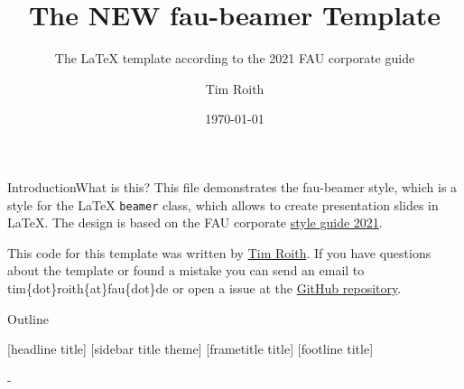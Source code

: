 \documentclass[final]{beamer}
\title[fau-beamer]{The NEW fau-beamer Template}
\subtitle{The \LaTeX{} template according to the 2021 FAU corporate guide}
\author[T. Roith]{Tim Roith}
\institute[FAU]{Friedrich-Alexander Universität Erlangen-Nürnberg, Department Mathematik}
\date{\today}
\begin{document}
\begin{trueplainframe}{}
\titlepage%
\end{trueplainframe}

\begin{frame}[t]{Introduction}{What is this?}
This file demonstrates the fau-beamer style, which is a style for the \LaTeX{} \texttt{beamer} class, which allows to create presentation slides in \LaTeX. The design is based on the FAU corporate \href{https://www.intern.fau.de/kommunikation-marketing-und-corporate-identity/corporate-identity/}{ style guide 2021}.

This code for this template was written by \href{https://timroith.github.io/}{Tim Roith}. If you have questions about the template or found a mistake you can send an email to tim\{dot\}roith\{at\}fau\{dot\}de or open a issue at the \href{https://github.com/FAU-AMMN/fau-beamer}{GitHub repository}.
\end{frame}

\begin{frame}[t]{Outline}
\tableofcontents
\end{frame}

{
[headline title]
[sidebar title theme]
[frametitle title]
[footline title]

\begin{frame}{-}
%
\hypersetup{linkcolor=TitleFont}
\tableofcontents
\end{frame}
}


\end{document}
